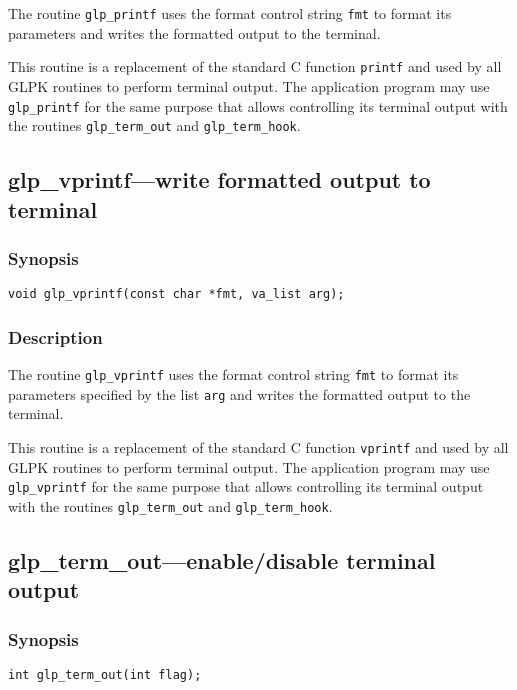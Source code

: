 The routine \verb|glp_printf| uses the format control string
\verb|fmt| to format its parameters and writes the formatted output to
the terminal.

This routine is a replacement of the standard C function
\verb|printf| and used by all GLPK routines to perform terminal
output. The application program may use \verb|glp_printf| for the same
purpose that allows controlling its terminal output with the routines
\verb|glp_term_out| and \verb|glp_term_hook|.

\subsection{glp\_vprintf---write formatted output to terminal}

\subsubsection*{Synopsis}

\begin{verbatim}
void glp_vprintf(const char *fmt, va_list arg);
\end{verbatim}

\subsubsection*{Description}

The routine \verb|glp_vprintf| uses the format control string
\verb|fmt| to format its parameters specified by the list \verb|arg|
and writes the formatted output to the terminal.

This routine is a replacement of the standard C function
\verb|vprintf| and used by all GLPK routines to perform terminal
output. The application program may use \verb|glp_vprintf| for the same
purpose that allows controlling its terminal output with the routines
\verb|glp_term_out| and \verb|glp_term_hook|.

\newpage

\subsection{glp\_term\_out---enable/disable terminal output}

\subsubsection*{Synopsis}

\begin{verbatim}
int glp_term_out(int flag);
\end{verbatim}

